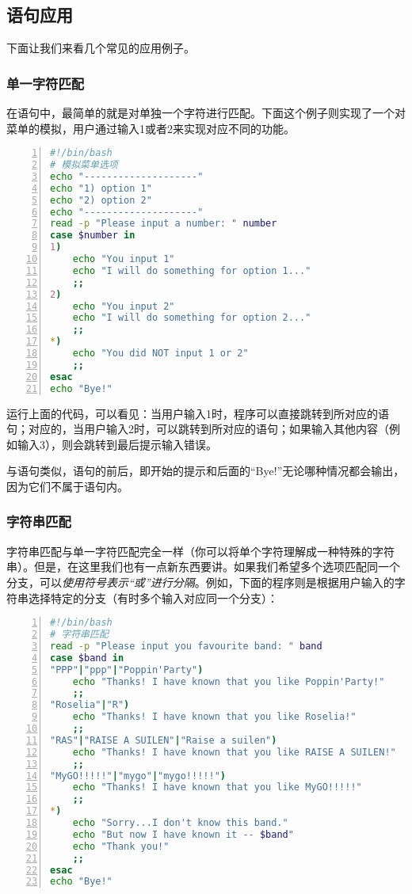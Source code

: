 \subsection{语句应用}\label{subsec:case分支语句-case分支语句应用}

下面让我们来看几个常见的应用例子。

\subsubsection{单一字符匹配}

在语句中，最简单的就是对单独一个字符进行匹配。下面这个例子则实现了一个对菜单的模拟，用户通过输入1或者2来实现对应不同的功能。

\begin{lstlisting}[language=bash,caption=simple\_menu,numbers=left]
#!/bin/bash
# 模拟菜单选项
echo "--------------------"
echo "1) option 1"
echo "2) option 2"
echo "--------------------"
read -p "Please input a number: " number
case $number in
1)
    echo "You input 1"
    echo "I will do something for option 1..."
    ;;
2)
    echo "You input 2"
    echo "I will do something for option 2..."
    ;;
*)
    echo "You did NOT input 1 or 2"
    ;;
esac
echo "Bye!"
\end{lstlisting}

运行上面的代码，可以看见：当用户输入1时，程序可以直接跳转到所对应的语句；对应的，当用户输入2时，可以跳转到所对应的语句；如果输入其他内容（例如输入3），则会跳转到最后提示输入错误。

\begin{attention}
    与语句类似，语句的前后，即开始的提示和后面的“Bye!”无论哪种情况都会输出，因为它们不属于语句内。
\end{attention}

\subsubsection{字符串匹配}

字符串匹配与单一字符匹配完全一样（你可以将单个字符理解成一种特殊的字符串）。但是，在这里我们也有一点新东西要讲。如果我们希望多个选项匹配同一个分支，可以\emph{使用\code{|}符号表示“或”进行分隔}。例如，下面的程序则是根据用户输入的字符串选择特定的分支（有时多个输入对应同一个分支）：

\begin{lstlisting}[language=bash,caption=favourite\_band,numbers=left]
#!/bin/bash
# 字符串匹配
read -p "Please input you favourite band: " band
case $band in
"PPP"|"ppp"|"Poppin'Party")
    echo "Thanks! I have known that you like Poppin'Party!"
    ;;
"Roselia"|"R")
    echo "Thanks! I have known that you like Roselia!"
    ;;
"RAS"|"RAISE A SUILEN"|"Raise a suilen")
    echo "Thanks! I have known that you like RAISE A SUILEN!"
    ;;
"MyGO!!!!!"|"mygo"|"mygo!!!!!")
    echo "Thanks! I have known that you like MyGO!!!!!"
    ;;
*)
    echo "Sorry...I don't know this band."
    echo "But now I have known it -- $band"
    echo "Thank you!"
    ;;
esac
echo "Bye!"
\end{lstlisting}

